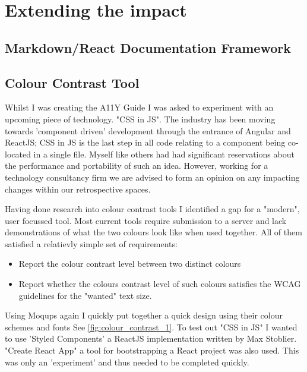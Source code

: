 \section{Extending the impact}
\subsection{Markdown/React Documentation Framework}
\subsection{Colour Contrast Tool}
Whilst I was creating the A11Y Guide I was asked to experiment with an
upcoming piece of technology. "CSS in JS". The industry has been moving
towards 'component driven' development through the entrance of Angular and
ReactJS; CSS in JS is the last step in all code relating to a
component being co-located in a single file. Myself like others had had
significant reservations about the performance and portability of such an
idea. However, working for a technology consultancy firm we are advised to
form an opinion on any impacting changes within our retrospective spaces.

Having done research into colour contrast tools I identified a gap for a
"modern", user focussed tool. Most current tools require submission to a
server and lack demonstrations of what the two colours look like when used
together. All of them satisfied a relatievly simple set of requirements:
\begin{itemize}
\item Report the colour contrast level between two distinct colours
\item Report whether the colours contrast level of such colours satisfies the
 WCAG guidelines for the "wanted" text size.
\end{itemize}

Using Moqups again I quickly put together a quick design using their colour
schemes and fonts See \ref{fig:colour_contrast_1}. To test out "CSS in JS" I
wanted to use 'Styled Components' a ReactJS implementation written by Max
Stoblier. "Create React App" a tool for bootstrapping a React project was also
used. This was only an 'experiment' and thus needed to be completed quickly.


